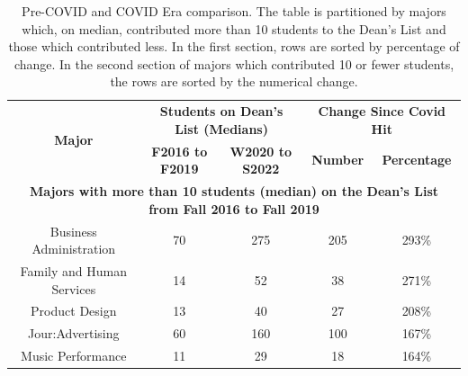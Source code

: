 \documentclass[10pt]{article}
\begin{document}
\small
\begin{longtable}[c]{|ccccc|}
	\caption{Pre-COVID and COVID Era comparison. The table is partitioned by majors which, on median, contributed more than 10 students to the Dean's List and those which contributed less.  In the first section, rows are sorted by percentage of change. In the second section of majors which contributed 10 or fewer students, the rows are sorted by the numerical change.}
	\label{tab:pre-post-covid}\\
	\hline
	\multicolumn{1}{|c|}{\multirow{2}{*}{\textbf{Major}}}            & \multicolumn{2}{c|}{\textbf{Students on Dean's List (Medians)}}                                                 & \multicolumn{2}{c|}{\textbf{Change Since Covid Hit}} \\ \cline{2-5} 
	\multicolumn{1}{|c|}{}                                           & \multicolumn{1}{c|}{\textbf{F2016 to F2019}} & \multicolumn{1}{c|}{\textbf{W2020 to S2022}} & \multicolumn{1}{c|}{\textbf{Number}}    & \textbf{Percentage}   \\ \hline
	\endhead
	\multicolumn{5}{|c|}{\textbf{Majors with more than 10 students (median) on the Dean's List from Fall 2016 to Fall 2019}}                                                                                                                             \\ \hline
	\multicolumn{1}{|c|}{Business Administration}                    & \multicolumn{1}{c|}{70}                              & \multicolumn{1}{c|}{275}                                 & \multicolumn{1}{c|}{205}                & 293\%                 \\ \hline
	\multicolumn{1}{|c|}{Family and Human Services}                  & \multicolumn{1}{c|}{14}                              & \multicolumn{1}{c|}{52}                                  & \multicolumn{1}{c|}{38}                 & 271\%                 \\ \hline
	\multicolumn{1}{|c|}{Product Design}                             & \multicolumn{1}{c|}{13}                              & \multicolumn{1}{c|}{40}                                  & \multicolumn{1}{c|}{27}                 & 208\%                 \\ \hline
	\multicolumn{1}{|c|}{Jour:Advertising}                           & \multicolumn{1}{c|}{60}                              & \multicolumn{1}{c|}{160}                                 & \multicolumn{1}{c|}{100}                & 167\%                 \\ \hline
	\multicolumn{1}{|c|}{Music Performance}                          & \multicolumn{1}{c|}{11}                              & \multicolumn{1}{c|}{29}                                  & \multicolumn{1}{c|}{18}                 & 164\%                 \\ \hline

\end{longtable}
\end{document}
